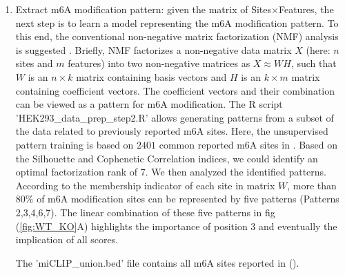 \documentclass[times, 11pt, a4paper]{article}
\begin{document}
\begin{enumerate}
\begin{spverbatim}
	$ bash README_processing.sh WT_vs_KO_RC22_call2_result.out hg38.genome GRCh38_96.fa path_to_output.
	\end{spverbatim}
	\item Extract 5mer features: rebuild the tabular features such that the scores: mismatch, insertion and deletion are represented for each position of the specific 5mer (NNANN). To do so, run the R script 'HEK293\_data\_prep.R'. This produces an R object named 'BigTable.rds', representing the matrix of Sites$\times$15 features corresponding to the mismatch, insertion and deletion scores for the observed site and its two flanking positions. Be aware to precise the path to outputs that contains already the preprocessed data and provide the sample's name as a label of the analysis.
	\begin{spverbatim} 
	$ Rscript HEK293_data_prep.R path_to_output WT_vs_KO_RC22_call2_result.out
	\end{spverbatim}
	\item Extract m6A modification pattern: given the matrix of Sites$\times$Features, the next step is to learn a model representing the m6A modification pattern. To this end, the conventional non-negative matrix factorization (NMF) analysis is suggested \cite{lee1999learning}. Briefly, NMF factorizes a non-negative data matrix $X$ (here: $n$ sites and $m$ features) into two non-negative matrices as $X \approx WH$, such that $W$ is an $n\times k$ matrix containing basis vectors and $H$ is an $k \times m$ matrix containing coefficient vectors. The coefficient vectors and their combination can be viewed as a pattern for m6A modification. The R script 'HEK293\_data\_prep\_step2.R' allows generating patterns from a subset of the data related to previously reported m6A sites. Here, the unsupervised pattern training is based on $2401$ common reported m6A sites in \cite{koh2019atlas} {}. Based on the Silhouette and Cophenetic Correlation indices, we could identify an optimal factorization rank of 7. We then analyzed the identified patterns. According to the membership indicator of each site in matrix $W$, more than $80\%$ of m6A modification sites can be represented by five patterns (Patterns 2,3,4,6,7). The linear combination of these five patterns in fig (\ref{fig:WT_KO}A) highlights the importance of position 3 and eventually the implication of all scores.
	The 'miCLIP\_union.bed' file contains all m6A sites reported in \cite{koh2019atlas} (). 

\end{enumerate}
\end{document}
